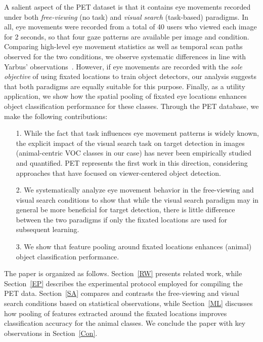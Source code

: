 \documentclass{article}
\begin{document}
A salient aspect of the PET dataset is that it contains eye movements recorded under both \textit{free-viewing} (no task) and \textit{visual search} (task-based) paradigms. In all, eye movements were recorded from a total of 40 users who viewed each image for 2 seconds, so that four gaze patterns are available per image and condition. Comparing high-level eye movement statistics as well as temporal scan paths observed for the two conditions, we observe systematic differences in line with Yarbus' observations~\cite{Yarbus1967}. However, if eye movements are recorded with the \textit{sole objective} of using fixated locations to train object detectors, our analysis suggests that both paradigms are equally suitable for this purpose. Finally, as a utility application, we show how the spatial pooling of fixated eye locations enhances object classification performance for these classes. Through the PET database, we make the following contributions:
\begin{itemize}[noitemsep,nolistsep]
\item[1.] While the fact that task influences eye movement patterns is widely known, the explicit impact of the visual search task on target detection in images (animal-centric VOC classes in our case) has never been empirically studied and quantified. PET represents the first work in this direction, considering approaches that have focused on viewer-centered object detection.
\item[2.] We systematically analyze eye movement behavior in the free-viewing and visual search conditions to show that while the visual search paradigm may in general be more beneficial for target detection, there is little difference between the two paradigms if only the fixated locations are used for subsequent learning.
\item[3.] We show that feature pooling around fixated locations enhances (animal) object classification performance.  
\end{itemize}




The paper is organized as follows. Section~\ref{RW} presents related work, while Section~\ref{EP} describes the experimental protocol employed for compiling the PET data. Section~\ref{SA} compares and contrasts the free-viewing and visual search conditions based on statistical observations, while Section~\ref{ML} discusses how pooling of features extracted around the fixated locations improves classification accuracy for the animal classes. We conclude the paper with key observations in Section~\ref{Con}. 
\end{document}
